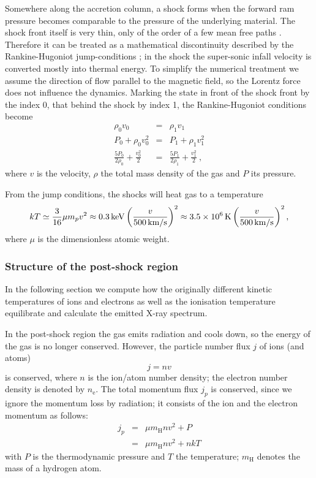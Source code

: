 Somewhere along the accretion column, a shock forms when the forward ram pressure becomes comparable to the pressure of the underlying material. The shock front itself is very thin, only of the order of a few mean free paths \cite{raizerzeldovich}. Therefore it can be treated as a mathematical discontinuity described by the Rankine-Hugoniot jump-conditions \cite[][chap.~7, \S~15]{raizerzeldovich}; in the shock the super-sonic infall velocity is converted mostly into thermal energy. To simplify the numerical treatment we assume the direction of flow parallel to the magnetic field, so the Lorentz force does not influence the dynamics. Marking the state in front of the shock front by the index 0, that behind the shock by index 1, the Rankine-Hugoniot conditions become
\begin{eqnarray}
\rho_0 v_0 &=& \rho_1 v_1 \label{RH1}\\
P_0+\rho_0 v_0^2 &=& P_1+\rho_1 v_1^2 \label{RH2}\\
\frac{5 P_0}{2\rho_0}+\frac{v_0^2}{2}&=&\frac{5 P_1}{2\rho_1}+\frac{v_1^2}{2} \ ,\label{RH3}
\end{eqnarray}
where $v$ is the velocity, $\rho$ the total mass density of the gas and $P$ its pressure.

From the jump conditions, the shocks will heat gas to a temperature
\begin{equation}
kT \simeq \frac{3}{16}\mu m_p v^{2} \approx 0.3\,{\rm keV}\left(\frac{v}{500\,{\rm km/s}}\right)^{2} \approx3.5\times10^6\,{\rm K} \left(\frac{v}{500\,{\rm km/s}}\right)^{2},
\label{eqn:Tshock}
\end{equation}
where $\mu$ is the dimensionless atomic weight.

\subsubsection{Structure of the post-shock region}

In the following section we compute how the originally different kinetic temperatures of ions and electrons as well as the ionisation temperature
equilibrate and calculate the emitted X-ray spectrum.

In the post-shock region the gas emits radiation and cools down, so the energy of the gas is no longer conserved.  However, the particle number flux $j$ of ions (and atoms)
\begin{equation}j=nv\label{j_n}\end{equation}
is conserved, where $n$ is the ion/atom number density; the electron number density is denoted by $n_{\mathrm{e}}$. The total momentum flux $j_p$ is conserved, since we ignore the momentum loss by radiation; it consists of the ion and the electron momentum as follows:
\begin{eqnarray}
j_p&=&\mu m_{\mathrm{H}} n v^2+P \nonumber \\
   &=&\mu m_{\mathrm{H}} n v^2+nkT \label{j_p}
\end{eqnarray}
with $P$ is the thermodynamic pressure and $T$ the temperature; $m_{\mathrm{H}}$ denotes the mass of a hydrogen atom.

